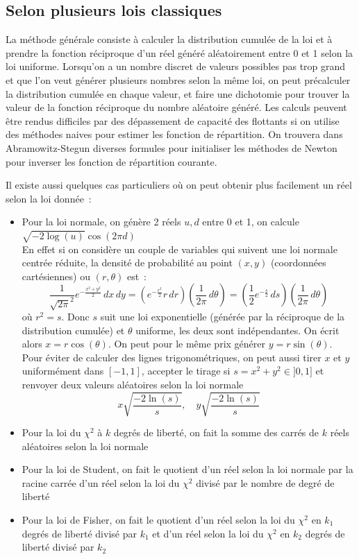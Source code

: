 \documentclass[a4paper,11pt]{article}
\begin{document}
\begin{giacjshere}
\subsection{Selon plusieurs lois classiques}
La m\'ethode g\'en\'erale consiste \`a calculer la distribution
cumul\'ee de la loi et \`a prendre la fonction r\'eciproque
d'un r\'eel g\'en\'er\'e al\'eatoirement entre 0 et 1 selon
la loi uniforme. Lorsqu'on a un nombre discret de valeurs possibles
pas trop grand et que l'on veut g\'en\'erer plusieurs
nombres selon la m\^eme loi, on peut pr\'ecalculer la distribution cumul\'ee
en chaque valeur, et faire une dichotomie pour trouver
la valeur de la fonction r\'eciproque du nombre al\'eatoire
g\'en\'er\'e. Les calculs peuvent être rendus difficiles
par des dépassement de capacité des flottants si on utilise
des méthodes naives pour estimer les fonction de répartition.
On trouvera dans Abramowitz-Stegun diverses formules 
pour initialiser les méthodes de Newton pour inverser les
fonction de répartition courante.

Il existe aussi quelques cas particuliers o\`u
on peut obtenir plus facilement un r\'eel selon la loi
donn\'ee~:
\begin{itemize}
\item Pour la loi normale, on g\'en\`ere 2 r\'eels $u,d$
entre 0 et 1, on calcule \\
$\sqrt{-2 \log(u)} \cos(2\pi d)$\\
En effet si on considère un couple de variables qui
suivent une loi normale centrée réduite, la densité de probabilité
au point $(x,y)$ (coordonnées cartésiennes) ou $(r,\theta)$ est~:
$$ \frac{1}{\sqrt{2\pi}^2} e^{-\frac{x^2+y^2}{2}} \, dx \, dy
=  \left( e^{-\frac{r^2}{2}} r  \, dr \right)
\left( \frac{1}{2\pi} \, d\theta \right)
= \left( \frac12 e^{-\frac s2} \, ds \right)
\left( \frac{1}{2\pi} \, d\theta \right)$$
où $r^2=s$. Donc $s$ suit une loi exponentielle (générée
par la réciproque de la distribution cumulée) et $\theta$
uniforme, les deux sont indépendantes. On écrit 
alors $x=r\cos(\theta)$. On peut pour le même prix
générer $y=r\sin(\theta)$. \\
Pour éviter de calculer
des lignes trigonométriques, on peut aussi tirer
$x$ et $y$ uniformément dans $[-1,1]$, accepter le tirage
si $s=x^2+y^2 \in ]0,1]$ et renvoyer deux valeurs
aléatoires selon la loi normale
$$ x \sqrt{\frac{-2\ln(s)}{s}}, \quad y \sqrt{\frac{-2\ln(s)}{s}} $$
\item Pour la loi du $\chi^2$ \`a $k$ degr\'es de libert\'e, 
on fait la somme
des carr\'es de $k$ r\'eels al\'eatoires selon la loi normale
\item Pour la loi de Student, on fait le quotient d'un réel
selon la loi normale par la racine carrée
d'un réel selon la loi du $\chi^2$ divisé par le nombre
de degré de liberté
\item Pour la loi de Fisher, on fait le quotient d'un réel
selon la loi du $\chi^2$ en $k_1$ degrés de liberté divisé par
$k_1$ et d'un réel
selon la loi du $\chi^2$ en $k_2$ degrés de liberté divisé par
$k_2$
\end{itemize}


\end{giacjshere}
\end{document}
